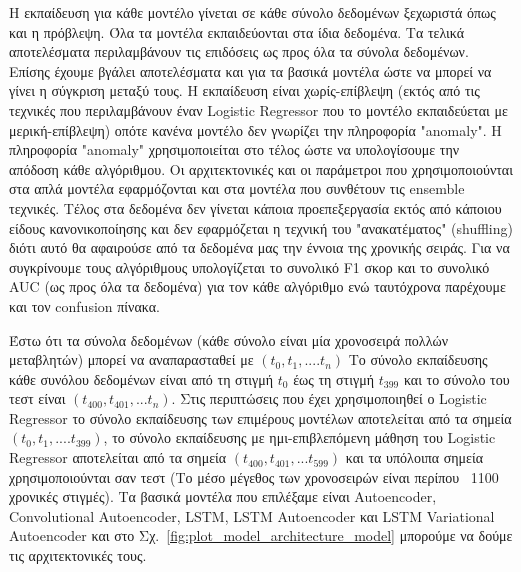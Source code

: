 \documentclass[a4paper,12pt]{report}
\theoremstyle{definitionNODot}
\begin{document}
	Η εκπαίδευση για κάθε μοντέλο γίνεται σε κάθε σύνολο δεδομένων ξεχωριστά όπως και η πρόβλεψη. Όλα τα μοντέλα εκπαιδεύονται στα ίδια δεδομένα. Τα τελικά αποτελέσματα περιλαμβάνουν τις επιδόσεις ως προς όλα τα σύνολα δεδομένων. Επίσης έχουμε βγάλει αποτελέσματα και για τα βασικά μοντέλα ώστε να μπορεί να γίνει η σύγκριση μεταξύ τους. Η εκπαίδευση είναι χωρίς-επίβλεψη (εκτός από τις τεχνικές που περιλαμβάνουν έναν Logistic Regressor που το μοντέλο εκπαιδεύεται με μερική-επίβλεψη) οπότε κανένα μοντέλο δεν γνωρίζει την πληροφορία "anomaly". Η πληροφορία "anomaly" χρησιμοποιείται στο τέλος ώστε να υπολογίσουμε την απόδοση κάθε αλγόριθμου. Οι αρχιτεκτονικές και οι παράμετροι που χρησιμοποιούνται στα απλά μοντέλα εφαρμόζονται και στα μοντέλα που συνθέτουν τις ensemble τεχνικές. Τέλος στα δεδομένα δεν γίνεται κάποια προεπεξεργασία εκτός από κάποιου είδους κανονικοποίησης και δεν εφαρμόζεται η τεχνική του "ανακατέματος" (shuffling) διότι αυτό θα αφαιρούσε από τα δεδομένα μας την έννοια της χρονικής σειράς. Για να συγκρίνουμε τους αλγόριθμους υπολογίζεται το συνολικό F1 σκορ και το συνολικό AUC (ως προς όλα τα δεδομένα) για τον κάθε αλγόριθμο ενώ ταυτόχρονα παρέχουμε και τον confusion πίνακα.
	
	Έστω ότι τα σύνολα δεδομένων (κάθε σύνολο είναι μία χρονοσειρά πολλών μεταβλητών) μπορεί να αναπαρασταθεί με $(t_0, t_1,....t_n)$  Το σύνολο εκπαίδευσης κάθε συνόλου δεδομένων είναι από τη στιγμή $t_0$ έως τη στιγμή $t_{399}$ και το σύνολο του τεστ είναι $(t_{400}, t_{401},...t_n)$. Στις περιπτώσεις που έχει χρησιμοποιηθεί ο Logistic Regressor το σύνολο εκπαίδευσης των επιμέρους μοντέλων αποτελείται από τα σημεία $(t_0, t_1,....t_{399})$, το σύνολο εκπαίδευσης με ημι-επιβλεπόμενη μάθηση του Logistic Regressor αποτελείται από τα σημεία $(t_{400}, t_{401},...t_{599})$ και τα υπόλοιπα σημεία χρησιμοποιούνται σαν τεστ (Το μέσο μέγεθος των χρονοσειρών είναι περίπου ~1100 χρονικές στιγμές). Τα βασικά μοντέλα που επιλέξαμε είναι Autoencoder, Convolutional Autoencoder, LSTM, LSTM Autoencoder και LSTM Variational Autoencoder και στο Σχ.~\ref{fig:plot_model_architecture_model} μπορούμε να δούμε τις αρχιτεκτονικές τους.
	
\end{document}
